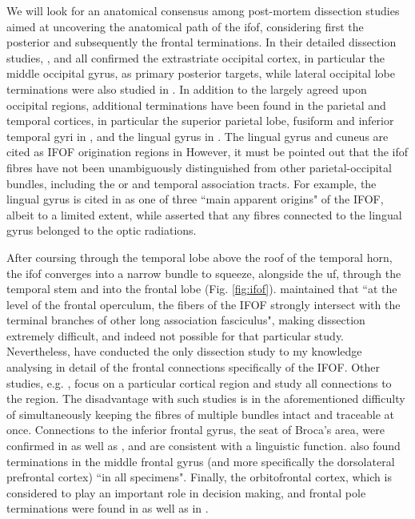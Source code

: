 We will look for an anatomical consensus among post-mortem dissection studies aimed at uncovering the anatomical path of the \gls{ifof}, considering first the posterior and subsequently the frontal terminations.
In their detailed dissection studies, \textcite{Martino2010}, and \textcite{Sarubbo2013} all confirmed the extrastriate occipital cortex, in particular the middle occipital gyrus, as primary posterior targets, while lateral occipital lobe terminations were also studied in \textcite{Palejwala2020}.
In addition to the largely agreed upon occipital regions, additional terminations have been found in the parietal and temporal cortices, in particular the superior parietal lobe, fusiform and inferior temporal gyri in \textcite{Martino2010}, and the lingual gyrus in \textcite{Sarubbo2013}.
The lingual gyrus and cuneus are cited as IFOF origination regions in \textcite{Palejwala2021}
However, it must be pointed out that the \gls{ifof} fibres have not been unambiguously distinguished from other parietal-occipital bundles, including the \gls{or} and temporal association tracts.
For example, the lingual gyrus is cited in \textcite{Sarubbo2013} as one of three ``main apparent origins" of the IFOF, albeit to a limited extent, while \textcite{Martino2010} asserted that any fibres connected to the lingual gyrus belonged to the optic radiations.

After coursing through the temporal lobe above the roof of the temporal horn,\autocite{Martino2010,Kljajevic2014a} the \gls{ifof} converges into a narrow bundle to squeeze, alongside the \gls{uf}, through the temporal stem and into the frontal lobe (Fig. \ref{fig:ifof}).\autocite{Martino2010,Sarubbo2013}
\textcite{Martino2010} maintained that ``at the level of the frontal operculum, the fibers of the IFOF strongly intersect with the terminal branches of other long association fasciculus", making dissection extremely difficult, and indeed not possible for that particular study.
Nevertheless, \textcite{Sarubbo2013} have conducted the only dissection study to my knowledge analysing in detail of the frontal connections specifically of the IFOF.
Other studies, e.g. \textcite{Burks2017}, focus on a particular cortical region and study all connections to the region.
The disadvantage with such studies is in the aforementioned difficulty of simultaneously keeping the fibres of multiple bundles intact and traceable at once.
Connections to the inferior frontal gyrus, the seat of Broca's area, were confirmed in \textcite{Sarubbo2013} as well as \textcite{Hau2016}, and are consistent with a linguistic function.
\textcite{Sarubbo2013} also found terminations in the middle frontal gyrus (and more specifically the dorsolateral prefrontal cortex) ``in all specimens".
Finally, the orbitofrontal cortex, which is considered to play an important role in decision making, and frontal pole terminations were found in \textcite{Sarubbo2013} as well as in \textcite{Burks2017}.

